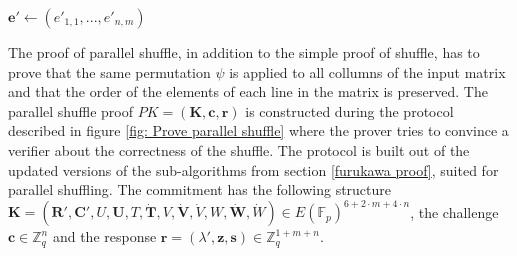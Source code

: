 \begin{algorithm}[H]
\DontPrintSemicolon
    \caption{\( \mathbf{ParallelShuffle}_Y (\boldsymbol{e}, \boldsymbol{r'}, \psi) \)}
    \( \boldsymbol{e'} \gets (e'_{1, 1}, ..., e'_{n, m}) \) \\
     
\end{algorithm}

The proof of parallel shuffle, in addition to the simple proof of shuffle, has to prove that the same permutation $\psi$ is applied to all collumns of the input matrix and that the order of the elements of each line in the matrix is preserved. The parallel shuffle proof \( PK = (\boldsymbol{K}, \boldsymbol{c}, \boldsymbol{r}) \) is constructed during the protocol described in figure \ref{fig: Prove parallel shuffle} where the prover tries to convince a verifier about the correctness of the shuffle. The protocol is built out of the updated versions of the sub-algorithms from section \ref{furukawa proof}, suited for parallel shuffling. The commitment has the following structure \( \boldsymbol{K} = (\boldsymbol{R'}, \boldsymbol{C'}, U, \boldsymbol{U}, T, \boldsymbol{\dot{T}}, V, \boldsymbol{\dot{V}}, \dot{V}, W, \boldsymbol{\dot{W}}, \dot{W}) \in E(\mathbb{F}_p)^{6 + 2 \cdot m + 4 \cdot n} \), the challenge \( \boldsymbol{c} \in \mathbb{Z}_q^{n} \) and the response \( \boldsymbol{r} = (\lambda', \boldsymbol{z}, \boldsymbol{s}) \in \mathbb{Z}_q^{1 + m + n} \).

